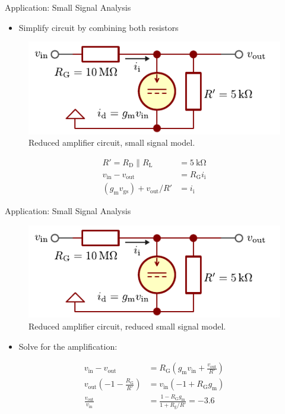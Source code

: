 \begin{frame}{Application: Small Signal Analysis}
    \begin{itemize}
        \item Simplify circuit by combining both resistors
    \end{itemize}
    \begin{figure}
        \centering
        \includegraphics{../assets/mosfet_amplifier_small_signal_reduced.pdf}
        \caption{Reduced amplifier circuit, small signal model.}
        \label{fig:mosfet_amplifier_ac_2}
    \end{figure}

    \begin{align*}
        R'=R_\mathrm{D} \parallel R_\mathrm{L} &= \qty{5}{\kilo \ohm} \\
        v_{\mathrm{in}}-v_{\mathrm{out}}&=R_{\mathrm{G}} i_{\mathrm{i}} \\
        (g_{\mathrm{m}}v_{\mathrm{gs}})+v_{\mathrm{out}} /R'&=i_{\mathrm{i}}
    \end{align*}
\end{frame}

\begin{frame}{Application: Small Signal Analysis}
    \begin{figure}
        \centering
        \includegraphics{../assets/mosfet_amplifier_small_signal_reduced.pdf}
        \caption{Reduced amplifier circuit, reduced small signal model.}
        \label{fig:mosfet_amplifier_ac_reduced}
    \end{figure}
    \begin{itemize}
        \item Solve for the amplification:
    \end{itemize}
    \begin{align*}
        v_{\mathrm{in}}-v_{\mathrm{out}}&=R_{\mathrm{G}}\left( g_{\mathrm{m}}v_{\mathrm{in}}+\frac{v_{\mathrm{out}}}{R'} \right) \\
        v_{\mathrm{out}}\left( -1-\frac{R_{\mathrm{G}}}{R'} \right)&=v_{\mathrm{in}}(-1+R_{\mathrm{G}}g_{\mathrm{m}}) \\
        \frac{v_{\mathrm{out}}}{v_{\mathrm{in}}}&=\frac{1-R_{\mathrm{G}}g_{\mathrm{m}}}{1+R_{\mathrm{g}} / R'}=\num{-3.6}
    \end{align*}
\end{frame}